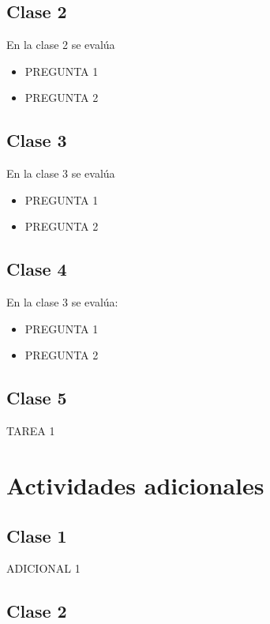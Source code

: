 \documentclass[12pt]{report}
\begin{document}
\section{Clase 2}

En la clase 2 se evalúa

\begin{itemize}
    \item PREGUNTA 1
    \item PREGUNTA 2
\end{itemize}

\section{Clase 3}

En la clase 3 se evalúa

\begin{itemize}
    \item PREGUNTA 1
    \item PREGUNTA 2
\end{itemize}

\section{Clase 4}

En la clase 3 se evalúa:

\begin{itemize}
    \item PREGUNTA 1
    \item PREGUNTA 2
\end{itemize}

\section{Clase 5}

TAREA 1

\chapter{Actividades adicionales}\label{adicional}

\section{Clase 1}

ADICIONAL 1

\section{Clase 2}
\end{document}

